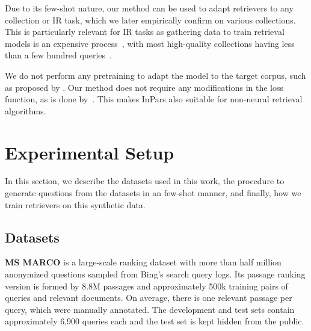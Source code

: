 \documentclass[11pt]{article}
\begin{document}
Due to its few-shot nature, our method can be used to adapt retrievers to any collection or IR task, which we later empirically confirm on various collections. This is particularly relevant for IR tasks as gathering data to train retrieval models is an expensive process~\cite{yilmaz2020reliability}, with most high-quality collections having less than a few hundred queries~\cite{Voorhees1999OverviewOT,Voorhees2004OverviewOT}.

We do not perform any pretraining to adapt the model to the target corpus, such as proposed by \citet{gao2021unsupervised}. Our method does not require any modifications in the loss function, as is done by~\citet{izacard2021towards,neelakantan2022text}. This makes InPars also suitable for non-neural retrieval algorithms.



\section{Experimental Setup}

In this section, we describe the datasets used in this work, the procedure to generate questions from the datasets in an few-shot manner, and finally, how we train retrievers on this synthetic data.

\subsection{Datasets}

\textbf{MS MARCO} \citet{DBLP:journals/corr/NguyenRSGTMD16} is a large-scale ranking dataset with more than half million anonymized questions sampled from Bing's search query logs. Its passage ranking version is formed by 8.8M passages and approximately 500k training pairs of queries and relevant documents. On average, there is one relevant passage per query, which were manually annotated. The development and test sets contain approximately 6,900 queries each and the test set is kept hidden from the public.
\end{document}
